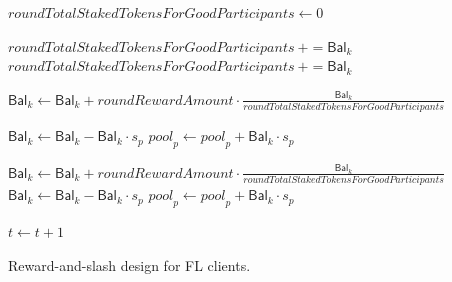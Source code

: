 \documentclass[conference]{IEEEtran}
\begin{document}
\begin{figure}[htbp]
\begin{mdframed}[backgroundcolor=gray!10, roundcorner=10pt]
\begin{algorithm}[H]
\begin{algorithmic}[1]
\State $roundTotalStakedTokensForGoodParticipants \leftarrow 0$


 \textcolor[HTML]{5E81B5}{}
            \State $roundTotalStakedTokensForGoodParticipants ~+= \mathsf{Bal}_k$
        \EndFor
\EndIf
            \State  $roundTotalStakedTokensForGoodParticipants ~+= \mathsf{Bal}_k$
            \EndIf
        \EndFor
       
        
        
        
         \textcolor[HTML]{5E81B5}{}
        

            \State $\mathsf{Bal}_k \leftarrow \mathsf{Bal}_k + roundRewardAmount \cdot \frac{\mathsf{Bal}_k}{ roundTotalStakedTokensForGoodParticipants}$
        \EndFor
        
        \Else
            \State $\mathsf{Bal}_k \leftarrow \mathsf{Bal}_k - \mathsf{Bal}_k \cdot s_p$
            \State ${pool}_p \leftarrow {pool}_p + \mathsf{Bal}_k \cdot s_p$
        \EndFor
        \EndIf
        
         \textcolor[HTML]{5E81B5}{}
            \State $\mathsf{Bal}_k \leftarrow \mathsf{Bal}_k + roundRewardAmount \cdot \frac{\mathsf{Bal}_k}{ roundTotalStakedTokensForGoodParticipants}$
            \Else
            \State $\mathsf{Bal}_k \leftarrow \mathsf{Bal}_k - \mathsf{Bal}_k \cdot s_p$
            \State ${pool}_p \leftarrow {pool}_p + \mathsf{Bal}_k \cdot s_p$
            \EndIf
        \EndFor
        
        \State $ t \leftarrow t + 1$
        \EndFor
    \end{algorithmic}
    \caption{Reward-and-slash design for FL clients.}
    \label{algo:all-fl-rewards}
\end{algorithm}
\end{mdframed}
\end{figure}
\end{document}

